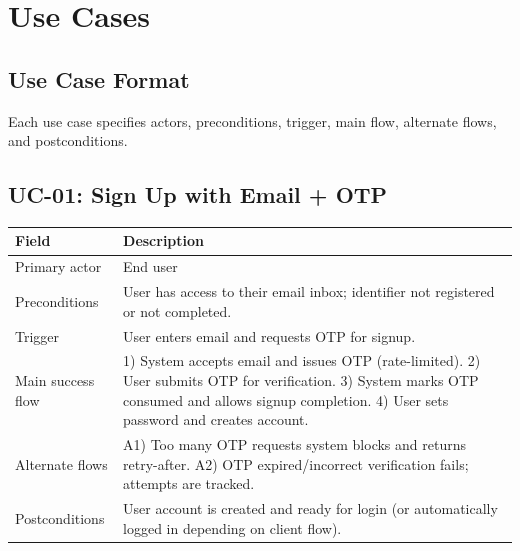 \documentclass[11pt]{article}
\begin{document}


    \section{Use Cases}\label{sec:usecases}

    \subsection{Use Case Format}
    Each use case specifies actors, preconditions, trigger, main flow, alternate flows, and postconditions.

    \subsection{UC-01: Sign Up with Email + OTP}
    \begin{tabularx}{\textwidth}{@{}lX@{}}
\toprule
\textbf{Field} & \textbf{Description} \\
\midrule
Primary actor & End user \\
Preconditions & User has access to their email inbox; identifier not registered or not completed. \\
Trigger & User enters email and requests OTP for signup. \\
Main success flow &
1) System accepts email and issues OTP (rate-limited). 2) User submits OTP for verification. 3) System marks OTP consumed and allows signup completion. 4) User sets password and creates account. \\
Alternate flows & A1) Too many OTP requests \textrightarrow{} system blocks and returns retry-after. A2) OTP expired/incorrect \textrightarrow{} verification fails; attempts are tracked. \\
Postconditions & User account is created and ready for login (or automatically logged in depending on client flow). \\
\bottomrule
    \end{tabularx}
\end{document}
